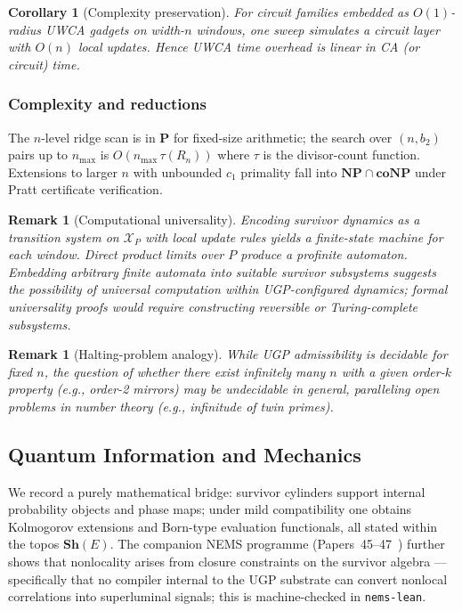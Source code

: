 \documentclass[12pt]{article}
\newtheorem{corollary}[theorem]{Corollary}
\newtheorem{remark}[theorem]{Remark}
\numberwithin{equation}{section}
\begin{document}
\begin{corollary}[Complexity preservation]
For circuit families embedded as $O(1)$-radius UWCA gadgets on width-$n$ windows, one sweep simulates a circuit layer with $O(n)$ local updates. Hence UWCA time overhead is linear in CA (or circuit) time.
\end{corollary}

\subsubsection{Complexity and reductions}
The $n$-level ridge scan is in $\mathbf{P}$ for fixed-size arithmetic; the search over $(n,b_2)$ pairs up to $n_{\max}$ is $O(n_{\max}\,\tau(R_n))$ where $\tau$ is the divisor-count function. Extensions to larger $n$ with unbounded $c_1$ primality fall into $\mathbf{NP}\cap\mathbf{coNP}$ under Pratt certificate verification.

\begin{remark}[Computational universality]
Encoding survivor dynamics as a transition system on $\mathscr{X}_P$ with local update rules yields a finite-state machine for each window. Direct product limits over $P$ produce a profinite automaton. Embedding arbitrary finite automata into suitable survivor subsystems suggests the possibility of universal computation within UGP-configured dynamics; formal universality proofs would require constructing reversible or Turing-complete subsystems.
\end{remark}

\begin{remark}[Halting-problem analogy]
While UGP admissibility is decidable for fixed $n$, the question of whether there exist infinitely many $n$ with a given order-$k$ property (e.g., order-2 mirrors) may be undecidable in general, paralleling open problems in number theory (e.g., infinitude of twin primes).
\end{remark}

\subsection{Quantum Information and Mechanics}\label{sec:quantum-bridge}
We record a purely mathematical bridge: survivor cylinders support internal probability objects and phase maps; under mild compatibility one obtains Kolmogorov extensions and Born-type evaluation functionals, all stated within the topos $\mathbf{Sh}(E)$. The companion NEMS programme (Papers~45--47~\cite{SpivackNEMSHub}) further shows that nonlocality arises from closure constraints on the survivor algebra — specifically that no compiler internal to the UGP substrate can convert nonlocal correlations into superluminal signals; this is machine-checked in \texttt{nems-lean}.
\end{document}
